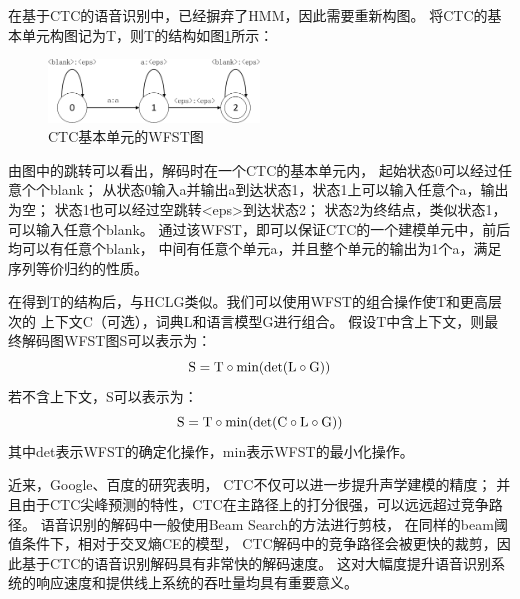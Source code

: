 在基于CTC的语音识别中，已经摒弃了HMM，因此需要重新构图。
将CTC的基本单元构图记为T，则T的结构如图\ref{fig:t}所示：
\begin{figure}
\centering
\includegraphics[width=0.5\textwidth]{figures/chapter4/t-crop}
\caption{CTC基本单元的WFST图}
\label{fig:t}
\end{figure}
由图中的跳转可以看出，解码时在一个CTC的基本单元内，
起始状态0可以经过任意个个blank；
从状态0输入a并输出a到达状态1，状态1上可以输入任意个a，输出为空；
状态1也可以经过空跳转<eps>到达状态2；
状态2为终结点，类似状态1，可以输入任意个blank。
通过该WFST，即可以保证CTC的一个建模单元中，前后均可以有任意个blank，
中间有任意个单元a，并且整个单元的输出为1个a，满足序列等价归约的性质。

在得到T的结构后，与HCLG类似。我们可以使用WFST的组合操作使T和更高层次的
上下文C（可选），词典L和语言模型G进行组合。
假设T中含上下文，则最终解码图WFST图S可以表示为：
\begin{equation}
{\rm{S = T}} \circ {\rm{min(det(L}} \circ {\rm{G))}}
\end{equation}
若不含上下文，S可以表示为：
\begin{equation}
{\rm{S = T}} \circ {\rm{min(det(C}} \circ {\rm{L}} \circ {\rm{G))}}
\end{equation}
其中det表示WFST的确定化操作，min表示WFST的最小化操作。

近来，Google、百度的研究表明，
CTC不仅可以进一步提升声学建模的精度；
并且由于CTC尖峰预测的特性，CTC在主路径上的打分很强，可以远远超过竞争路径。
语音识别的解码中一般使用Beam Search的方法进行剪枝，
在同样的beam阈值条件下，相对于交叉熵CE的模型，
CTC解码中的竞争路径会被更快的裁剪，因此基于CTC的语音识别解码具有非常快的解码速度。
这对大幅度提升语音识别系统的响应速度和提供线上系统的吞吐量均具有重要意义。 